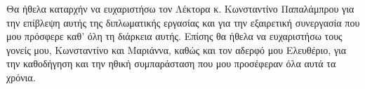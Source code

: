 \begin{acknowledgements}
Θα ήθελα καταρχήν να ευχαριστήσω τον Λέκτορα κ. Κωνσταντίνο Παπαλάμπρου 
για την επίβλεψη αυτής της διπλωματικής εργασίας και για την
εξαιρετική συνεργασία που μου πρόσφερε καθ' όλη τη διάρκεια αυτής. 
Επίσης θα ήθελα να ευχαριστήσω τους γονείς
μου, Κωνσταντίνο και Μαριάννα, καθώς και τον αδερφό μου Ελευθέριο,
για την καθοδήγηση και την ηθική συμπαράσταση που μου
προσέφεραν όλα αυτά τα χρόνια.
\end{acknowledgements}